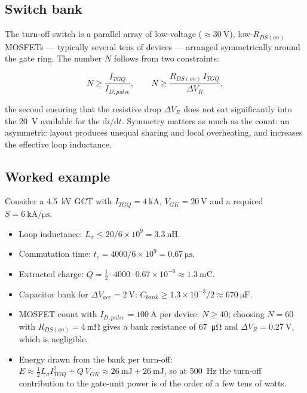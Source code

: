 \documentclass[11pt,a4paper]{report}
\begin{document}
\subsection{Switch bank}

The turn-off switch is a parallel array of low-voltage ($\approx\SI{30}{\volt}$),
low-$R_{DS(on)}$ MOSFETs --- typically several tens of devices --- arranged
symmetrically around the gate ring. The number $N$ follows from two constraints:

\begin{equation}
N \ge \frac{I_{TGQ}}{I_{D,pulse}},
\qquad
N \ge \frac{R_{DS(on)}\, I_{TGQ}}{\Delta V_{R}},
\end{equation}

the second ensuring that the resistive drop $\Delta V_{R}$ does not eat
significantly into the \SI{20}{\volt} available for the $\mathrm{d}i/\mathrm{d}t$.
Symmetry matters as much as the count: an asymmetric layout produces unequal
sharing and local overheating, and increases the effective loop inductance.

\subsection{Worked example}

Consider a \SI{4.5}{\kilo\volt} GCT with $I_{TGQ}=\SI{4}{\kilo\ampere}$,
$V_{GK}=\SI{20}{\volt}$ and a required
$S=\SI{6}{\kilo\ampere\per\micro\second}$.

\begin{itemize}[nosep]
  \item Loop inductance: $L_{\sigma}\le 20/6\times10^{9}=\SI{3.3}{\nano\henry}$.
  \item Commutation time: $t_{c}=4000/6\times10^{9}=\SI{0.67}{\micro\second}$.
  \item Extracted charge: $Q=\tfrac12\cdot4000\cdot0.67\times10^{-6}\approx\SI{1.3}{\milli\coulomb}$.
  \item Capacitor bank for $\Delta V_{acc}=\SI{2}{\volt}$:
        $C_{bank}\ge 1.3\times10^{-3}/2 \approx \SI{670}{\micro\farad}$.
  \item MOSFET count with $I_{D,pulse}=\SI{100}{\ampere}$ per device:
        $N\ge 40$; choosing $N=60$ with $R_{DS(on)}=\SI{4}{\milli\ohm}$ gives a
        bank resistance of \SI{67}{\micro\ohm} and $\Delta V_{R}=\SI{0.27}{\volt}$,
        which is negligible.
  \item Energy drawn from the bank per turn-off:
        $E \approx \tfrac12 L_{\sigma} I_{TGQ}^{2} + Q\,V_{GK}
        \approx \SI{26}{\milli\joule} + \SI{26}{\milli\joule}$, so at
        \SI{500}{\hertz} the turn-off contribution to the gate-unit power is of
        the order of a few tens of watts.
\end{itemize}
\end{document}
